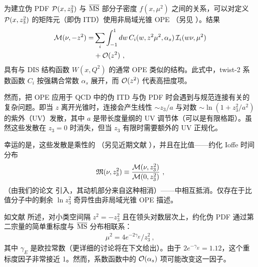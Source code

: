 为建立伪 PDF ${\cal P} (x,z_3^2)$ 与 $\overline{\rm MS}$ 部分子密度 $ f(x, \mu^2)$ 之间的关系，可以对定义 ${\cal P} (x,z_3^2)$ 的矩阵元（即伪 ITD）使用非局域光锥 OPE \cite{Anikin:1978tj,Balitsky:1987bk}（另见 \cite{Radyushkin:2017lvu}）。结果
\begin{align}
{\cal M } (\nu, -z^2 ) =&  \sum_i  \int_{-1}^1 dw \, C_i (w, z^2 \mu ^2, \alpha_s) \,  {\cal I}_i (w \nu,\mu^2)
\nonumber \\  & + {\cal O} (z^2)
  \  ,
\label{OPE}
\end{align}
具有与 DIS 结构函数 $W (x, Q^2)$ 的通常 OPE 类似的结构。此式中，twist-2 系数函数 $C_i$ 按强耦合常数 $\alpha_s$ 展开，而 ${\cal O} (z^2) $ 代表高扭度项。

然而，把 OPE 应用于 QCD 中的伪 ITD 与伪 PDF 时会遇到与规范连接有关的复杂问题。即当 $z$ 离开光锥时，连接会产生线性 $\sim z_3/a$ 与对数 $\sim \ln (1+z_3^2/a^2)$ 的紫外（UV）发散，其中 $a$ 是带长度量纲的 UV 调节体（可以是有限格距）。虽然这些发散在 $z_3=0$ 时消失，但当 $z_3$ 有限时需要额外的 UV 正规化。

幸运的是，这些发散是乘性的 \mbox{\cite{Polyakov:1980ca,Dotsenko:1979wb,Brandt:1981kf,Aoyama:1981ev,Craigie:1980qs}}（另见近期文献 \cite{Ishikawa:2017faj,Ji:2017oey,Green:2017xeu}），并且在比值——约化 Ioffe 时间分布
 \begin{align}
{\mathfrak M} (\nu, z_3^2) \equiv \frac{ {\cal M} (\nu, z_3^2)}{{\cal M} (0, z_3^2)} \   ,
 \label{redm}
\end{align}
（由我们的论文 \cite{Radyushkin:2017cyf} 引入，其动机部分来自这种相消）——中相互抵消。仅存在于比值分子中的剩余 $\ln z_3^2$ 奇异性由非局域光锥 OPE 描述。

如文献 \cite{Orginos:2017kos} 所述，对小类空间隔 $z^2=-z_3^2$ 且在领头对数层次上，约化伪 PDF 通过第二宗量的简单重标度与 $\overline{\rm MS}$ 分布相联系：
\begin{align}
\mu^2  =4e^{-2\gamma_E}/ z_3^2
  \  ,
\label{Ptof}
\end{align}
其中 $\gamma_E$ 是欧拉常数（更详细的讨论将在下文给出）。由于 \mbox{$2e^{-\gamma_E}=1.12$}，这个重标度因子非常接近 1。然而，系数函数中的 $ {\cal O} (\alpha_s) $ 项可能改变这一因子。
